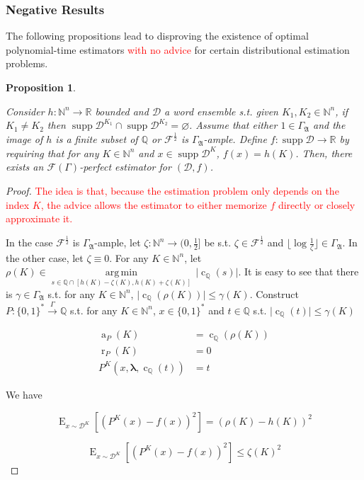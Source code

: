 \documentclass[11pt]{article}
\numberwithin{equation}{section}
\theoremstyle{definition}
\theoremstyle{plain}
\newtheorem{proposition}{Proposition}[section]
\newcommand{\Bool}{\{0,1\}}
\newcommand{\Words}{{\Bool^*}}
\DeclareMathOperator{\Supp}{supp}
\DeclareMathOperator{\E}{E}
\DeclareMathOperator{\R}{r}
\DeclareMathOperator{\A}{a}
\DeclareMathOperator{\En}{c}
\newcommand{\Argmin}[1]{\underset{#1}{\operatorname{arg\,min}}\,}
\newcommand{\Nats}{\mathbb{N}}
\newcommand{\Rats}{\mathbb{Q}}
\newcommand{\Reals}{\mathbb{R}}
\newcommand{\NatFun}{\Nats^n \rightarrow}
\newcommand{\Estr}{\bm{\lambda}}
\newcommand{\Abs}[1]{\lvert #1 \rvert}
\newcommand{\Floor}[1]{\lfloor #1 \rfloor}
\newcommand{\Dist}{\mathcal{D}}
\newcommand{\GrowA}{\Gamma_{\mathfrak{A}}}
\newcommand{\Fall}{\mathcal{F}}
\newcommand{\EG}{\Fall(\Gamma)}
\newcommand{\Scheme}{\xrightarrow{\Gamma}}
\begin{document}
\subsubsection{Negative Results}

The following propositions lead to disproving the existence of optimal polynomial-time estimators \textcolor{red}{with no advice} for certain distributional estimation problems.

\begin{samepage}
\begin{proposition}
\label{prp:tally_perfect}

Consider ${h: \Nats^n \rightarrow \Reals}$ bounded and ${\Dist}$ a word ensemble s.t. given ${K_1, K_2 \in \Nats^n}$, if ${K_1 \ne K_2}$ then ${\Supp \Dist^{K_1} \cap \Supp \Dist^{K_2} = \varnothing}$. Assume that either ${1 \in \GrowA}$ and the image of ${h}$ is a finite subset of ${\Rats}$ or ${\Fall^{\frac{1}{2}}}$ is ${\GrowA}$-ample. Define ${f: \Supp \Dist \rightarrow \Reals}$ by requiring that for any ${K \in \Nats^n}$ and ${x \in \Supp \Dist^K}$, ${f(x)=h(K)}$. Then, there exists an ${\EG}$-perfect estimator for ${(\Dist,f)}$.

\end{proposition}
\end{samepage}

\begin{proof}

\textcolor{red}{The idea is that, because the estimation problem only depends on the index $K$, the advice allows the estimator to either memorize $f$ directly or closely approximate it.}

In the case ${\Fall^{\frac{1}{2}}}$ is ${\GrowA}$-ample, let $\zeta: \NatFun (0,\frac{1}{2}]$ be s.t.  $\zeta \in \Fall^{\frac{1}{2}}$ and $\Floor{\log \frac{1}{\zeta}} \in \GrowA$. In the other case, let ${\zeta \equiv 0}$. For any $K \in \Nats^n$, let ${\rho(K) \in \Argmin{s \in \Rats \cap [h(K)-\zeta(K),h(K)+\zeta(K)]} \Abs{\En_\Rats(s)}}$. It is easy to see that there is $\gamma \in \GrowA$ s.t. for any ${K \in \Nats^n}$, ${\Abs{\En_\Rats(\rho(K))} \leq \gamma(K)}$. Construct ${P: \Words \Scheme \Rats}$ s.t. for any ${K \in \Nats^n}$, ${x \in \Words}$ and ${t \in \Rats}$ s.t. ${\Abs{\En_\Rats(t)} \leq \gamma(K)}$ 

\begin{align*}
\A_P(K) &= \En_\Rats(\rho(K)) \\
\R_P(K) &= 0 \\
P^K(x,\Estr,\En_\Rats(t)) &= t
\end{align*}

We have

\[\E_{x \sim \Dist^K}[(P^K(x)-f(x))^2] = (\rho(K)-h(K))^2\]

\[\E_{x \sim \Dist^K}[(P^K(x)-f(x))^2] \leq \zeta(K)^2\]
%
\end{proof}
\end{document}
